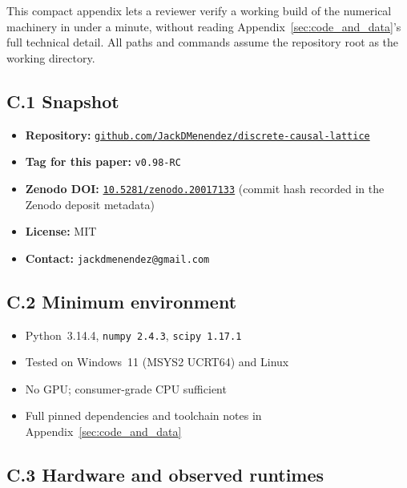 
\label{sec:reproducibility}

This compact appendix lets a reviewer verify a working build of the
numerical machinery in under a minute, without reading
Appendix~\ref{sec:code_and_data}'s full technical detail.  All paths
and commands assume the repository root as the working directory.

\subsection*{C.1 Snapshot}

\begin{itemize}\setlength{\itemsep}{0.2em}
\item \textbf{Repository:}
\href{https://github.com/JackDMenendez/discrete-causal-lattice}%
{\texttt{github.com/JackDMenendez/discrete-causal-lattice}}
\item \textbf{Tag for this paper:} \texttt{v0.98-RC}
\item \textbf{Zenodo DOI:}
\href{https://doi.org/10.5281/zenodo.20017133}%
{\texttt{10.5281/zenodo.20017133}}
(commit hash recorded in the Zenodo deposit metadata)
\item \textbf{License:} MIT
\item \textbf{Contact:} \texttt{jackdmenendez@gmail.com}
\end{itemize}

\subsection*{C.2 Minimum environment}

\begin{itemize}\setlength{\itemsep}{0.2em}
\item Python~3.14.4, \texttt{numpy~2.4.3}, \texttt{scipy~1.17.1}
\item Tested on Windows~11 (MSYS2 UCRT64) and Linux
\item No GPU; consumer-grade CPU sufficient
\item Full pinned dependencies and toolchain notes in
Appendix~\ref{sec:code_and_data}
\end{itemize}

\subsection*{C.3 Hardware and observed runtimes}

